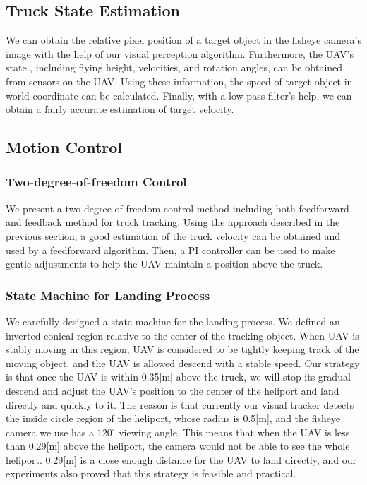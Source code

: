 \documentclass{standalone}
\begin{document}
\subsection{Truck State Estimation}

We can obtain the relative pixel position of a target object in the fisheye camera's image with the help of our visual perception algorithm. Furthermore, the UAV's state , including flying height, velocities, and rotation angles, can be obtained from sensors on the UAV. Using these information, the speed of target object in world coordinate can be calculated. Finally, with a low-pass filter's help, we can obtain a fairly accurate estimation of target velocity.

\subsection{Motion Control}

\subsubsection{Two-degree-of-freedom Control}

We present a two-degree-of-freedom control method including both feedforward and feedback method for truck tracking. Using the approach described in the previous section, a good estimation of the truck velocity can be obtained and used by a feedforward algorithm. Then, a PI controller can be used to make gentle adjustments to help the UAV maintain a position above the truck.

\subsubsection{State Machine for Landing Process}

We carefully designed a state machine for the landing process. We defined an inverted conical region relative to the center of the tracking object. When UAV is stably moving in this region, UAV is considered to be tightly keeping track of the moving object, and the UAV is allowed descend with a stable speed. Our strategy is that once the UAV is within 0.35[m] above the truck, we will stop its gradual descend and adjust the UAV's position to the center of the heliport and land directly and quickly to it. The reason is that currently our visual tracker detects the inside circle region of the heliport, whose radius is 0.5[m], and the fisheye camera we use has a $120^\circ$ viewing angle. This means that when the UAV is less than 0.29[m] above the heliport, the camera would not be able to see the whole heliport. 0.29[m] is a close enough distance for the UAV to land directly, and our experiments also proved that this strategy is feasible and practical.
\end{document}
